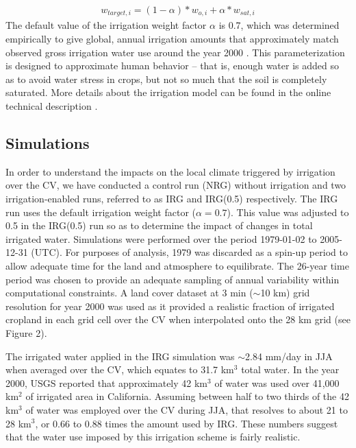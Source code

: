 \documentclass[draft,ms]{agutex}   %
\begin{document}
\begin{article}
\begin{align} \label{eq:TargetSoilMoisture}
w_{target,i} = (1-{\alpha})*w_{o,i} + {\alpha}*w_{sat,i}
\end{align} The default value of the irrigation weight factor $\alpha$ is 0.7, which was determined empirically to give global, annual irrigation amounts that approximately match observed gross irrigation water use around the year 2000 \citep{shiklomanov2000appraisal}. This parameterization is designed to approximate human behavior -- that is, enough water is added so as to avoid water stress in crops, but not so much that the soil is completely saturated. More details about the irrigation model can be found in the online technical description \citep{irrigationTechnicCLM}.

\subsection{Simulations}

In order to understand the impacts on the local climate triggered by irrigation over the CV, we have conducted a control run (NRG) without irrigation and two irrigation-enabled runs, referred to as IRG and IRG(0.5) respectively. The IRG run uses the default irrigation weight factor ($\alpha = 0.7$).  This value was adjusted to 0.5 in the IRG(0.5) run so as to determine the impact of changes in total irrigated water. Simulations were performed over the period 1979-01-02 to 2005-12-31 (UTC).  For purposes of analysis, 1979 was discarded as a spin-up period to allow adequate time for the land and atmosphere to equilibrate. The 26-year time period was chosen to provide an adequate sampling of annual variability within computational constraints. A land cover dataset at 3 min ($\sim$10 km) grid resolution for year 2000 was used as it provided a realistic fraction of irrigated cropland in each grid cell over the CV when interpolated onto the 28 km grid (see Figure 2). 

The irrigated water applied in the IRG simulation was $\sim$2.84 mm/day in JJA when averaged over the CV, which equates to 31.7 km$^3$ total water. In the year 2000, USGS reported that approximately 42 km$^3$ of water was used over 41,000 km$^2$ of irrigated area in California. Assuming between half to two thirds of the 42 km$^3$ of water was employed over the CV during JJA, that resolves to about 21 to 28 km$^3$, or 0.66 to 0.88 times the amount used by IRG. These numbers suggest that the water use imposed by this irrigation scheme is fairly realistic.


\end{article}
\end{document}
